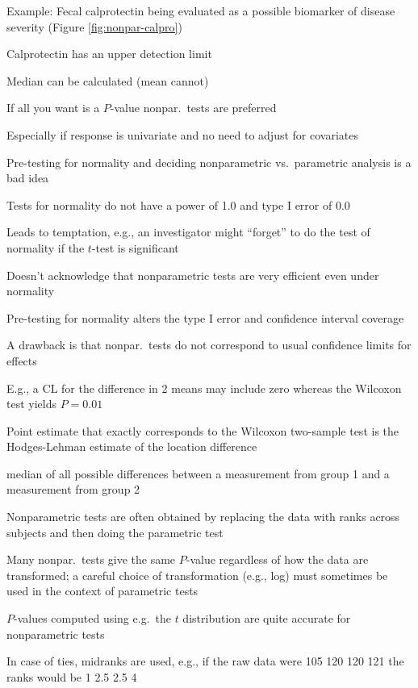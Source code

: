 \item Example: Fecal calprotectin being evaluated as a possible
  biomarker of disease severity (Figure \ref{fig:nonpar-calpro})
 \bi 
  \item Calprotectin has an upper detection limit
  \item Median can be calculated (mean cannot)
 \ei
\item If all you want is a $P$-value nonpar.\ tests are preferred
 \bi
 \item Especially if response is univariate and no need to adjust for
   covariates
 \ei
\item Pre-testing for normality and deciding nonparametric
  vs.\ parametric analysis is a bad idea
 \bi
 \item Tests for normality do not have a power of 1.0 and type I error
   of 0.0
 \item Leads to temptation, e.g., an investigator might ``forget'' to do the
   test of normality if the $t$-test is significant
 \item Doesn't acknowledge that nonparametric tests are very efficient
   even under normality
 \item Pre-testing for normality alters the type I error and confidence interval coverage
 \ei
\item A drawback is that nonpar.\ tests do not correspond to
  usual confidence limits for effects
 \bi
  \item E.g., a CL for the difference in 2 means may include zero whereas
  the Wilcoxon test yields $P=0.01$
  \item Point estimate that exactly corresponds to the Wilcoxon
    two-sample test is the Hodges-Lehman estimate of the location
    difference
  \bi
  \item median of all possible differences between a measurement from
    group 1 and a measurement from group 2
  \ei
 \ei
\item Nonparametric tests are often obtained by replacing the data
  with ranks across subjects and then doing the parametric test
\item Many nonpar.\ tests give the same $P$-value regardless of how
  the data are transformed; a careful choice of transformation (e.g.,
  log) must sometimes be used in the context of parametric tests
\item $P$-values computed using e.g.\ the $t$ distribution are quite
  accurate for nonparametric tests
\item In case of ties, midranks are used, e.g., if the raw data were
  105 120 120 121 the ranks would be 1 2.5 2.5 4

